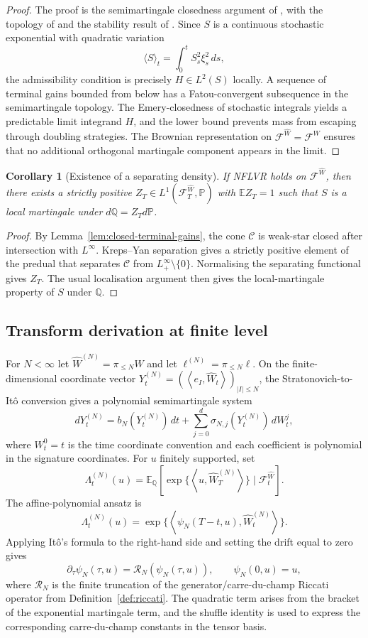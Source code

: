 \documentclass[11pt,oneside]{article}
\theoremstyle{plain}
\newtheorem{corollary}[theorem]{Corollary}
\theoremstyle{definition}
\theoremstyle{remark}
\newcommand{\E}{\mathbb{E}}
\newcommand{\Q}{\mathbb{Q}}
\newcommand{\Pp}{\mathbb{P}}
\newcommand{\cW}{\widehat W}
\newcommand{\FWh}{\mathcal F^{\widehat W}}
\newcommand{\FW}{\mathcal F^W}
\newcommand{\Rs}{\mathcal R}
\newcommand{\inner}[2]{\left\langle #1,#2\right\rangle}
\begin{document}
\begin{proof}
The proof is the semimartingale closedness argument of \citet{DelbaenSchachermayer1994}, with the topology of \citet{Emery1979} and the stability result of \citet{Memin1980}. Since $S$ is a continuous stochastic exponential with quadratic variation
\[
\langle S\rangle_t=\int_0^t S_s^2\xi_s^2\,ds,
\]
the admissibility condition is precisely $H\in L^2(S)$ locally. A sequence of terminal gains bounded from below has a Fatou-convergent subsequence in the semimartingale topology. The Emery-closedness of stochastic integrals yields a predictable limit integrand $H$, and the lower bound prevents mass from escaping through doubling strategies. The Brownian representation on $\FWh=\FW$ ensures that no additional orthogonal martingale component appears in the limit.
\end{proof}

\begin{corollary}[Existence of a separating density]
\label{cor:separating-density}
If NFLVR holds on $\FWh$, then there exists a strictly positive $Z_T\in L^1(\FWh_T,\Pp)$ with $\E Z_T=1$ such that $S$ is a local martingale under $d\Q=Z_Td\Pp$.
\end{corollary}

\begin{proof}
By Lemma~\ref{lem:closed-terminal-gains}, the cone $\mathcal C$ is weak-star closed after intersection with $L^\infty$. Kreps--Yan separation gives a strictly positive element of the predual that separates $\mathcal C$ from $L^\infty_+\setminus\{0\}$. Normalising the separating functional gives $Z_T$. The usual localisation argument then gives the local-martingale property of $S$ under $\Q$.
\end{proof}

\subsection{Transform derivation at finite level}
\label{subsec:finite-transform-derivation}
For $N<\infty$ let $\cW^{(N)}=\pi_{\leq N}\cW$ and let $\ell^{(N)}=\pi_{\leq N}\ell$. On the finite-dimensional coordinate vector $Y^{(N)}_t=(\inner{e_I}{\cW_t})_{|I|\leq N}$, the Stratonovich-to-It\^o conversion gives a polynomial semimartingale system
\[
dY^{(N)}_t=b_N(Y^{(N)}_t)\,dt+\sum_{j=0}^d\sigma_{N,j}(Y^{(N)}_t)\,dW^j_t,
\]
where $W^0_t=t$ is the time coordinate convention and each coefficient is polynomial in the signature coordinates. For $u$ finitely supported, set
\[
\Lambda_t^{(N)}(u)=\E_\Q\left[\exp\{\inner{u}{\cW^{(N)}_T}\}\mid \FWh_t\right].
\]
The affine-polynomial ansatz is
\[
\Lambda_t^{(N)}(u)=\exp\{\inner{\psi_N(T-t,u)}{\cW^{(N)}_t}\}.
\]
Applying It\^o's formula to the right-hand side and setting the drift equal to zero gives
\[
\partial_\tau\psi_N(\tau,u)=\Rs_N(\psi_N(\tau,u)),\qquad \psi_N(0,u)=u,
\]
where $\Rs_N$ is the finite truncation of the generator/carre-du-champ Riccati operator from Definition~\ref{def:riccati}. The quadratic term arises from the bracket of the exponential martingale term, and the shuffle identity is used to express the corresponding carre-du-champ constants in the tensor basis.
\end{document}
